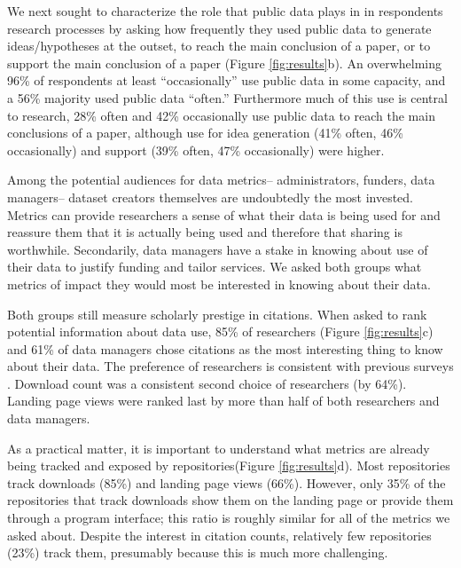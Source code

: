 \documentclass[english]{article}
\begin{document}
We next sought to characterize the role that public data plays in in respondents research processes by asking how frequently they used public data to generate ideas/hypotheses at the outset, to reach the main conclusion of a paper, or to support the main conclusion of a paper (Figure \ref{fig:results}b).
An overwhelming 96\% of respondents at least ``occasionally'' use public data in some capacity, and a 56\% majority used public data ``often.''
Furthermore much of this use is central to research, 28\% often and 42\% occasionally use public data to reach the main conclusions of a paper, although use for idea generation (41\% often, 46\% occasionally) and support (39\% often, 47\% occasionally) were higher.



Among the potential audiences for data metrics-- administrators, funders, data managers-- dataset creators themselves are undoubtedly the most invested.
Metrics can provide researchers a sense of what their data is being used for and reassure them that it is actually being used and therefore that sharing is worthwhile.
Secondarily, data managers have a stake in knowing about use of their data to justify funding and tailor services.
We asked both groups what metrics of impact they would most be interested in knowing about their data. 

Both groups still measure scholarly prestige in citations.
When asked to rank potential information about data use, 85\% of researchers (Figure \ref{fig:results}c) and 61\% of data managers chose citations as the most interesting thing to know about their data. 
The preference of researchers is consistent with previous surveys \cite{kratz_researcher_2015}.
Download count was a consistent second choice of researchers (by 64\%). 
Landing page views were ranked last by more than half of both researchers and data managers.

As a practical matter, it is important to understand what metrics are already being tracked and exposed by repositories(Figure \ref{fig:results}d). 
Most repositories track downloads (85\%) and landing page views (66\%). 
However, only 35\% of the repositories that track downloads show them on the landing page or provide them through a program interface; this ratio is roughly similar for all of the metrics we asked about. 
Despite the interest in citation counts, relatively few repositories (23\%) track them, presumably because this is much more challenging. 
\end{document}
